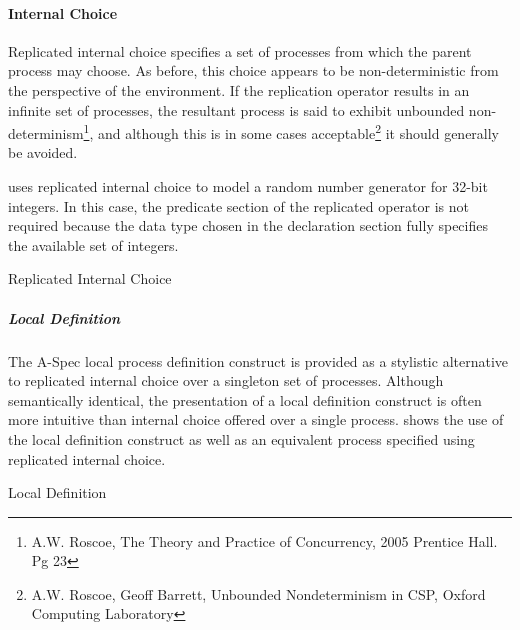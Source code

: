 \documentclass[letterpaper,10pt,draft]{book}
\begin{document}
\paragraph{Internal Choice}
   \label{sect:ReplInternal}

Replicated internal choice specifies a set of processes from which the parent process
may choose.  As before, this choice appears to be non-deterministic from the perspective
of the environment.  If the replication operator results in an infinite set of processes,
the resultant process is said to exhibit unbounded non-determinism\footnote{A.W.
Roscoe, The Theory and Practice of Concurrency, 2005 Prentice Hall. Pg 23}, and
although this is in some cases acceptable\footnote{A.W. Roscoe, Geoff Barrett,
Unbounded Nondeterminism in CSP, Oxford Computing Laboratory} it should generally
be avoided.

 uses replicated internal choice to model a random number
generator for 32-bit integers.  In this case, the predicate section of the replicated
operator is not required because the data type chosen in the declaration section
fully specifies the available set of integers.

\begin{example}
\begin{minipage}[t]{0.49\linewidth}
   
\end{minipage}
\begin{minipage}[t]{0.49\linewidth}
   \azbox
   
\end{minipage}

   \caption{Replicated Internal Choice}
   \label{ex:ReplInternal}
\end{example}

\subparagraph{Local Definition}
   \label{sect:LetProc}

The A-Spec local process definition construct is provided as a stylistic alternative
to replicated internal choice over a singleton set of processes.  Although semantically
identical, the presentation of a local definition construct is often more intuitive
than internal choice offered over a single process.   shows the
use of the local definition construct as well as an equivalent process specified
using replicated internal choice.

\begin{example}
\begin{minipage}[t]{0.49\linewidth}
   
\end{minipage}
\begin{minipage}[t]{0.49\linewidth}
   \azbox
   
\end{minipage}

   \caption{Local Definition}
   \label{ex:LetProc}
\end{example}
\end{document}
